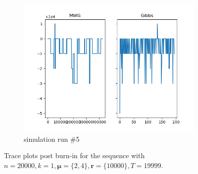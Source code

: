 \begin{figure}[H]
\begin{subfigure}{.3\textwidth}
    	\includegraphics[width=\linewidth]{../../plots/Trace_post_burnin_M2_N20000_NMCMC3_seed4_diffind2.png}
    	\caption{simulation run \#5}
	\end{subfigure}
	\caption{Trace plots post burn-in for the sequence with $n=20000, k=1, \bm{\mu} = \{2,4\}, \bm{r} = \{10000\}, T=19999$.}
\end{figure}

